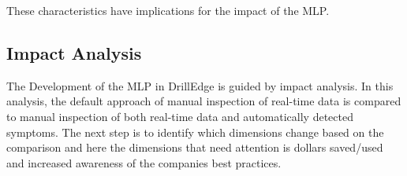 \documentclass{article}
\theoremstyle{theorem}
\theoremstyle{definition}
\begin{document}
These characteristics have implications for the impact of the MLP.


%

\subsection{Impact Analysis}

The Development of the MLP in DrillEdge is guided by impact analysis. 
In this analysis, the default approach of manual inspection of real-time data is compared to manual inspection of both real-time data and automatically detected symptoms.
The next step is to identify which dimensions change based on the comparison and here the dimensions that need attention is dollars saved/used and increased awareness of the companies best practices. 


\end{document}
